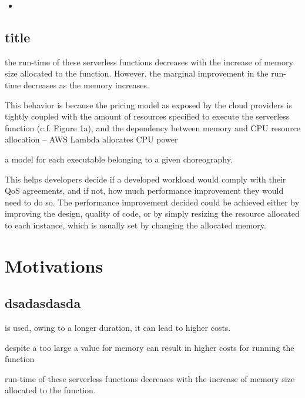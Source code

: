 \documentclass[12pt,a4paper]{report}
\begin{document}
\begin{itemize}
	\item 
\end{itemize}

\subsection{title}





the run-time of these serverless
functions decreases with the increase of memory size allocated
to the function. However, the marginal improvement in the
run-time decreases as the memory increases.

This behavior
is because the pricing model as exposed by the cloud providers
is tightly coupled with the amount of resources speciﬁed
to execute the serverless function (c.f. Figure 1a), and the
dependency between memory and CPU resource allocation –
AWS Lambda allocates CPU power


a model for each executable belonging to a given choreography.



This helps developers decide if a developed
workload would comply with their QoS agreements, and if
not, how much performance improvement they would need
to do so. The performance improvement decided could be
achieved either by improving the design, quality of code, or
by simply resizing the resource allocated to each instance,
which is usually set by changing the allocated memory.








\section{Motivations}



\subsection{dsadasdasda}

is used, owing to a longer duration, it can lead to higher costs.  




despite a too large a value for memory can result in higher costs for running the function




run-time of these serverless
functions decreases with the increase of memory size allocated
to the function.
\end{document}
